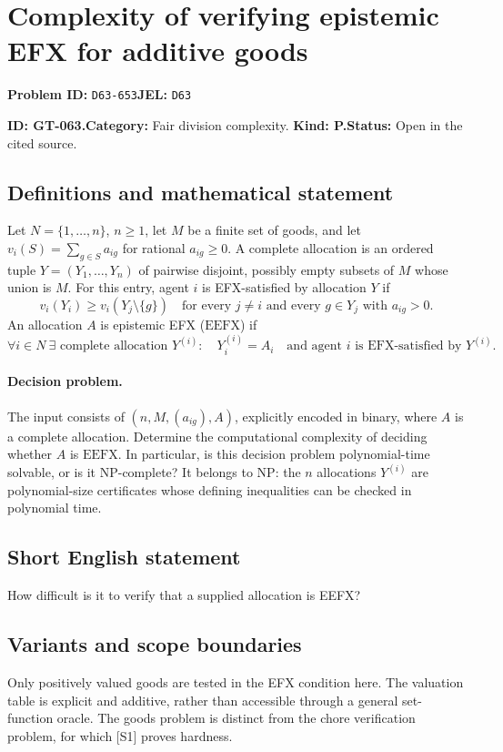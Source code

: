 \documentclass[11pt,a4paper]{article}
\begin{document}
\section*{Complexity of verifying epistemic EFX for additive goods}
\textbf{Problem ID:} \texttt{D63-653}\quad \textbf{JEL:} \texttt{D63}\par
\label{problem:OP-0193}
\label{game:GT-063}
{\sffamily\small\color{muted}
\noindent\textbf{ID: GT-063.}\quad\textbf{Category:} Fair division complexity.
\quad\textbf{Kind: P.}\quad\textbf{Status:} Open in the cited source.
\par}
\subsection*{Definitions and mathematical statement}
Let \(N=\{1,\ldots,n\}\), \(n\geq1\), let \(M\) be a finite set of goods, and let
\(v_i(S)=\sum_{g\in S}a_{ig}\) for rational \(a_{ig}\geq 0\).
A complete allocation is an ordered tuple \(Y=(Y_1,\ldots,Y_n)\) of pairwise disjoint, possibly empty subsets of \(M\) whose union is \(M\).
For this entry, agent \(i\) is EFX-satisfied by allocation \(Y\) if
\[
 v_i(Y_i)\geq v_i(Y_j\setminus\{g\})
 \quad
 \text{for every }j\ne i
 \text{ and every }g\in Y_j\text{ with }a_{ig}>0.
\]
An allocation \(A\) is epistemic EFX (\(\mathrm{EEFX}\)) if
\[
 \forall i\in N\ \exists\text{ complete allocation }Y^{(i)}:
 \quad Y^{(i)}_i=A_i
 \quad\text{and agent }i\text{ is EFX-satisfied by }Y^{(i)}.
\]

\paragraph{Decision problem.}
The input consists of \((n,M,(a_{ig}),A)\), explicitly encoded in binary,
where \(A\) is a complete allocation. Determine the computational
complexity of deciding whether \(A\) is \(\mathrm{EEFX}\).
In particular, is this decision problem polynomial-time solvable,
or is it NP-complete? It belongs to NP: the \(n\) allocations \(Y^{(i)}\)
are polynomial-size certificates whose defining inequalities can be
checked in polynomial time.

\subsection*{Short English statement}
How difficult is it to verify that a supplied allocation is EEFX?

\subsection*{Variants and scope boundaries}
Only positively valued goods are tested in the EFX condition here.
The valuation table is explicit and additive, rather than accessible
through a general set-function oracle. The goods problem is distinct
from the chore verification problem, for which [S1] proves hardness.
\end{document}
